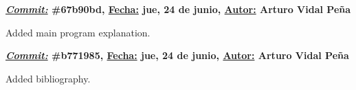 \item \textbf{\underline{\textit{Commit:}} \#67b90bd, \underline{Fecha:} jue, 24 de junio, \underline{Autor:} Arturo Vidal Peña}\\\item[] Added main program explanation.\\
\item \textbf{\underline{\textit{Commit:}} \#b771985, \underline{Fecha:} jue, 24 de junio, \underline{Autor:} Arturo Vidal Peña}\\\item[] Added bibliography.\\